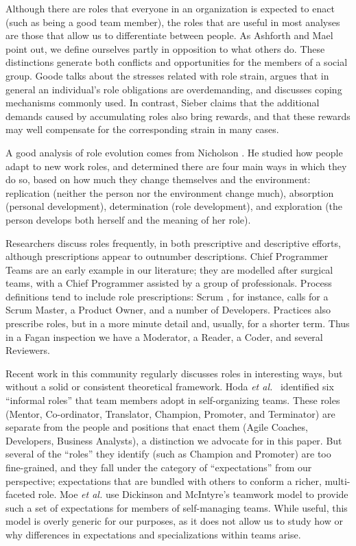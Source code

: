 \documentclass[10pt, conference, compsocconf]{IEEEtran}
\begin{document}
Although there are roles that everyone in an organization is expected to enact (such as being a good team member), the roles that are useful in most analyses are those that allow us to differentiate between people. As Ashforth and Mael \cite{Ashforth1989} point out, we define ourselves partly in opposition to what others do. These distinctions generate both conflicts and opportunities for the members of a social group. Goode \cite{Goode1960} talks about the stresses related with role strain, argues that in general an individual's role obligations are overdemanding, and discusses coping mechanisms commonly used. In contrast, Sieber \cite{Sieber1974} claims that the additional demands caused by accumulating roles also bring rewards, and that these rewards may well compensate for the corresponding strain in many cases. 

A good analysis of role evolution comes from Nicholson \cite{Nicholson1984}. He studied how people adapt to new work roles, and determined there are four main ways in which they do so, based on how much they change themselves and the environment: replication (neither the person nor the environment change much), absorption (personal development), determination (role development), and exploration (the person develops both herself and the meaning of her role).


Researchers discuss roles frequently, in both prescriptive and descriptive efforts, although prescriptions appear to outnumber descriptions. Chief Programmer Teams \cite{Baker1972} are an early example in our literature; they are modelled after surgical teams, with a Chief Programmer assisted by a group of professionals. Process definitions tend to include role prescriptions: Scrum \cite{Schwaber2001}, for instance, calls for a Scrum Master, a Product Owner, and a number of Developers. Practices also prescribe roles, but in a more minute detail and, usually, for a shorter term. Thus in a Fagan inspection \cite{Fagan1976} we have a Moderator, a Reader, a Coder, and several Reviewers.

Recent work in this community regularly discusses roles in interesting ways, but without a solid or consistent theoretical framework. Hoda \emph{et al.}\ \cite{Hoda2010} identified six ``informal roles'' that team members adopt in self-organizing teams. These roles (Mentor, Co-ordinator, Translator, Champion, Promoter, and Terminator) are separate from the people and positions that enact them (Agile Coaches, Developers, Business Analysts), a distinction we advocate for in this paper. But several of the ``roles'' they identify (such as Champion and Promoter) are too fine-grained, and they fall under the category of ``expectations'' from our perspective; expectations that are bundled with others to conform a richer, multi-faceted role. Moe \emph{et al.} \cite{Moe2010} use Dickinson and McIntyre's \cite{Dickinson1997} teamwork model to provide such a set of expectations for members of self-managing teams. While useful, this model is overly generic for our purposes, as it does not allow us to study how or why differences in expectations and specializations within teams arise.
\end{document}
